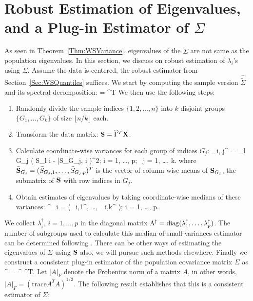 \section{Robust Estimation of Eigenvalues, and a Plug-in Estimator of $\Sigma$}
\label{Sec:Eigen}


As seen in Theorem~\ref{Thm:WSVariance}, eigenvalues of the $\tilde{\Sigma}$ 
are not same as the population eigenvalues. In this section, we discuss on robust 
estimation of $\lambda_{i}$'s using $\tilde{\Sigma}$. Assume the data 
is centered, the robust estimator from Section~\ref{Sec:WSQuantiles} suffices. 
We start by computing 
the sample version $\widehat{\tilde{\Sigma}}$ and its spectral decomposition:
\ban 
\widehat{\tilde{\Sigma}} = \widehat{{\Gamma}} \widehat{\tilde{\Lambda}}
\widehat{{\Gamma}}^{T}
\ean 
We then use the following steps:

\begin{enumerate}
\item Randomly divide the sample indices $\{1,2, \ldots, n\}$ into $k$ disjoint groups $\{G_1,\ldots, G_k \}$ of size $\lfloor n/k \rfloor$ each.

\item Transform the data matrix: 
${\mathbf{S}} = \widehat{{\Gamma}}^{T} {\mathbf{X}}$.

\item Calculate coordinate-wise variances for each group of indices $G_j$:
%
\ban
\lambda_{i, j}^{\dagger} =  \sum_{l \in G_j} \bigl( 
S_{l i} - \bar{S}_{G_{j}, i} \bigr)^2; \quad i = 1, \ldots, p; \  j = 1, \ldots, k.
\ean
where $\bar{{\mathbf{S}}}_{G_j} = (\bar{S}_{G_j, 1}, \ldots, \bar{S}_{G_j,p})^T$ is the vector of 
column-wise means of ${\mathbf{S}}_{G_j}$, the submatrix of ${\mathbf{S}}$ with row indices in $G_j$.
%

\item Obtain estimates of eigenvalues by taking coordinate-wise medians of these variances:
%
\ban
{\lambda}^{\dagger}_{i} =  (\lambda_{i,1}^{\dagger}, 
\ldots , \lambda_{i,k}^{\dagger} ); \quad 
i = 1, \ldots, p.
\ean
%
\end{enumerate}
%

We collect ${\lambda}^{\dagger}_{i}$, $ i =1, \ldots, p$ in the diagonal matrix 
${\Lambda}^{\dagger} = \operatorname*{diag} ({\lambda}^{\dagger}_{1}, \ldots, 
{\lambda}^{\dagger}_{p})$. The number of subgroups used to calculate this median-of-small-variances estimator can be determined following \cite{ref:Bernoulli152308_Minsker_Median_Banach}. 
There can be other ways of estimating the eigenvalues of $\Sigma$ using ${\mathbf{S}}$ also, we will pursue such methods elsewhere. Finally we construct a consistent plug-in estimator of the population covariance matrix $\Sigma$ as 
\ban 
{\Sigma}^{\dagger}
= \widehat{{\Gamma}} {\Lambda}^{\dagger} \widehat{{\Gamma}}^{T}.
\ean
Let $| A |_{F}$ denote the Frobenius norm of a matrix $A$, in other words, $| A |_{F} = (\text{trace} A^{T} A)^{1/2}$. The following result establishes that this is a consistent estimator of $\Sigma$:

